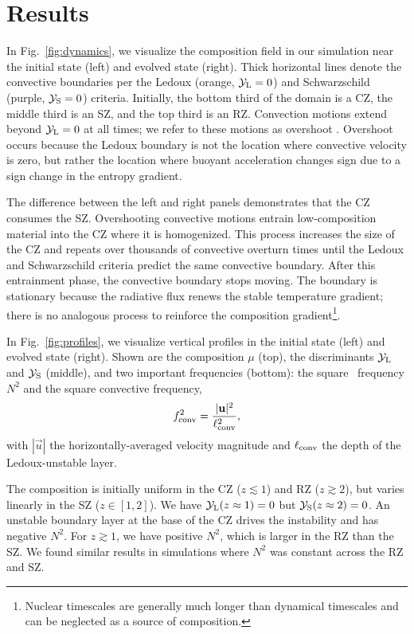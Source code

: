\section{Results}
\label{sec:results}

In Fig.~\ref{fig:dynamics}, we visualize the composition field in our simulation near the initial state (left) and evolved state (right).
Thick horizontal lines denote the convective boundaries per the Ledoux (orange, $\mathcal{Y}_{\rm{L}} = 0$) and Schwarzschild (purple, $\mathcal{Y}_{\rm{S}}=0$) criteria.
Initially, the bottom third of the domain is a CZ, the middle third is an SZ, and the top third is an RZ.
Convection motions extend beyond $\mathcal{Y}_{\rm{L}} = 0$ at all times; we refer to these motions as overshoot \citep[which is discussed in][]{korre_etal_2019}.
Overshoot occurs because the Ledoux boundary is not the location where convective velocity is zero, but rather the location where buoyant acceleration changes sign due to a sign change in the entropy gradient.

The difference between the left and right panels demonstrates that the CZ consumes the SZ.
Overshooting convective motions entrain low-composition material into the CZ where it is homogenized.
This process increases the size of the CZ and repeats over thousands of convective overturn times until the Ledoux and Schwarzschild criteria predict the same convective boundary.
After this entrainment phase, the convective boundary stops moving.
The boundary is stationary because the radiative flux renews the stable temperature gradient; there is no analogous process to reinforce the composition gradient\footnote{Nuclear timescales are generally much longer than dynamical timescales and can be neglected as a source of composition.}.

In Fig.~\ref{fig:profiles}, we visualize vertical profiles in the initial state (left) and evolved state (right).
Shown are the composition $\mu$ (top), the discriminants $\mathcal{Y}_{\rm{L}}$ and $\mathcal{Y}_{\rm{S}}$ (middle), and two important frequencies (bottom): the square \brunt$\,$ frequency $N^2$ and the square convective frequency,
\begin{equation}
f_{\rm{conv}}^2 = \frac{|\vec{u}|^2}{\ell_{\rm{conv}}^2},
\label{eqn:fconv2}
\end{equation}
with $|\vec{u}|$ the horizontally-averaged velocity magnitude and $\ell_{\rm{conv}}$ the depth of the Ledoux-unstable layer.

The composition is initially uniform in the CZ (${z \lesssim 1}$) and RZ ($z \gtrsim 2$), but varies linearly in the SZ ($z \in [1, 2]$).
We have $\mathcal{Y}_{\rm{L}}(z\approx1) = 0$ but $\mathcal{Y}_{\rm{S}}(z\approx2) = 0$.
An unstable boundary layer at the base of the CZ drives the instability and has negative $N^2$.
For $z \gtrsim 1$, we have positive $N^2$, which is larger in the RZ than the SZ.
We found similar results in simulations where $N^2$ was constant across the RZ and SZ.


